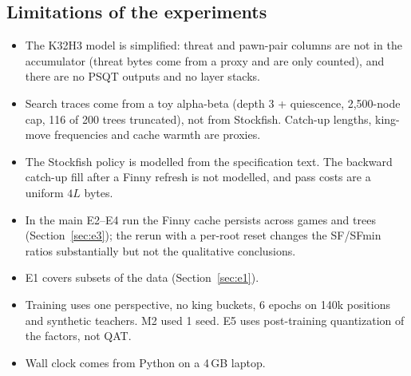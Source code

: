 \subsection{Limitations of the experiments}
\begin{itemize}[leftmargin=*,itemsep=1pt]
\item The K32H3 model is simplified: threat and pawn-pair columns are not in the accumulator (threat bytes come from a proxy and are only counted), and there are no PSQT outputs and no layer stacks.
\item Search traces come from a toy alpha-beta (depth 3 + quiescence, 2,500-node cap, 116 of 200 trees truncated), not from Stockfish. Catch-up lengths, king-move frequencies and cache warmth are proxies.
\item The Stockfish policy is modelled from the specification text. The backward catch-up fill after a Finny refresh is not modelled, and pass costs are a uniform $4L$ bytes.
\item In the main E2--E4 run the Finny cache persists across games and trees (Section~\ref{sec:e3}); the rerun with a per-root reset changes the SF/SFmin ratios substantially but not the qualitative conclusions.
\item E1 covers subsets of the data (Section~\ref{sec:e1}).

\item Training uses one perspective, no king buckets, 6 epochs on 140k positions and synthetic teachers. M2 used 1 seed. E5 uses post-training quantization of the factors, not QAT.
\item Wall clock comes from Python on a 4\,GB laptop.
\end{itemize}
